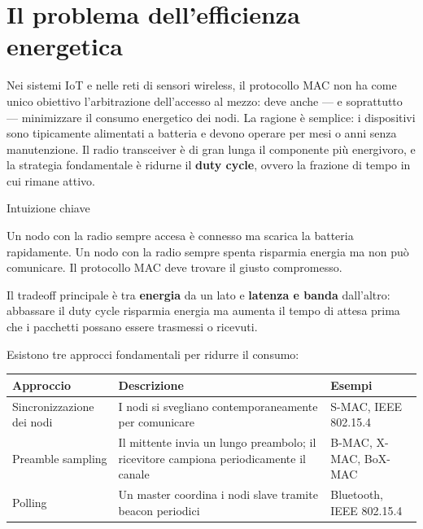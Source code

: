 \documentclass[
  italian,
  openany]{book}
\newcounter{none} %
\begin{document}
\section{Il problema dell'efficienza
energetica}\label{il-problema-dellefficienza-energetica}

Nei sistemi IoT e nelle reti di sensori wireless, il protocollo MAC non
ha come unico obiettivo l'arbitrazione dell'accesso al mezzo: deve anche
--- e soprattutto --- minimizzare il consumo energetico dei nodi. La
ragione è semplice: i dispositivi sono tipicamente alimentati a batteria
e devono operare per mesi o anni senza manutenzione. Il radio
transceiver è di gran lunga il componente più energivoro, e la strategia
fondamentale è ridurne il \textbf{duty cycle}, ovvero la frazione di
tempo in cui rimane attivo.

\begin{callouttip}{Intuizione chiave}

Un nodo con la radio sempre accesa è connesso ma scarica la batteria
rapidamente. Un nodo con la radio sempre spenta risparmia energia ma non
può comunicare. Il protocollo MAC deve trovare il giusto compromesso.

\end{callouttip}

Il tradeoff principale è tra \textbf{energia} da un lato e
\textbf{latenza e banda} dall'altro: abbassare il duty cycle risparmia
energia ma aumenta il tempo di attesa prima che i pacchetti possano
essere trasmessi o ricevuti.

Esistono tre approcci fondamentali per ridurre il consumo:

{\def\LTcaptype{none} %
\begin{longtable}[]{@{}
  >{\raggedright\arraybackslash}p{}
  >{\raggedright\arraybackslash}p{}
  >{\raggedright\arraybackslash}p{}@{}}
\toprule\noalign{}
\begin{minipage}[b]{\linewidth}\raggedright
Approccio
\end{minipage} & \begin{minipage}[b]{\linewidth}\raggedright
Descrizione
\end{minipage} & \begin{minipage}[b]{\linewidth}\raggedright
Esempi
\end{minipage} \\
\midrule\noalign{}
\endhead
\bottomrule\noalign{}
\endlastfoot
Sincronizzazione dei nodi & I nodi si svegliano contemporaneamente per
comunicare & S-MAC, IEEE 802.15.4 \\
Preamble sampling & Il mittente invia un lungo preambolo; il ricevitore
campiona periodicamente il canale & B-MAC, X-MAC, BoX-MAC \\
Polling & Un master coordina i nodi slave tramite beacon periodici &
Bluetooth, IEEE 802.15.4 \\
\end{longtable}
}
\end{document}
